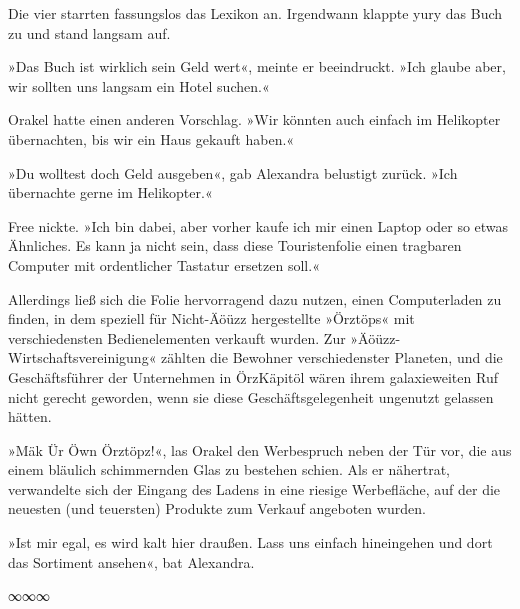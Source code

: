 
Die vier starrten fassungslos das Lexikon an. Irgendwann klappte yury das Buch zu und stand langsam auf.

»Das Buch ist wirklich sein Geld wert«, meinte er beeindruckt. »Ich glaube aber, wir sollten uns langsam ein Hotel suchen.«

Orakel hatte einen anderen Vorschlag. »Wir könnten auch einfach im Helikopter übernachten, bis wir ein Haus gekauft haben.«

»Du wolltest doch Geld ausgeben«, gab Alexandra belustigt zurück. »Ich übernachte gerne im Helikopter.«

Free nickte. »Ich bin dabei, aber vorher kaufe ich mir einen Laptop oder so etwas Ähnliches. Es kann ja nicht sein, dass diese Touristenfolie einen tragbaren Computer mit ordentlicher Tastatur ersetzen soll.«

Allerdings ließ sich die Folie hervorragend dazu nutzen, einen Computerladen zu finden, in dem speziell für Nicht-Äöüzz hergestellte »Örztöps« mit verschiedensten Bedienelementen verkauft wurden. Zur »Äöüzz-Wirtschaftsvereinigung« zählten die Bewohner verschiedenster Planeten, und die Geschäftsführer der Unternehmen in ÖrzKäpitöl wären ihrem galaxieweiten Ruf nicht gerecht geworden, wenn sie diese Geschäftsgelegenheit ungenutzt gelassen hätten.

»Mäk Ür Öwn Örztöpz!«, las Orakel den Werbespruch neben der Tür vor, die aus einem bläulich schimmernden Glas zu bestehen schien. Als er nähertrat, verwandelte sich der Eingang des Ladens in eine riesige Werbefläche, auf der die neuesten (und teuersten) Produkte zum Verkauf angeboten wurden.

»Ist mir egal, es wird kalt hier draußen. Lass uns einfach hineingehen und dort das Sortiment ansehen«, bat Alexandra.

\begin{center}
    ∞∞∞
\end{center}

